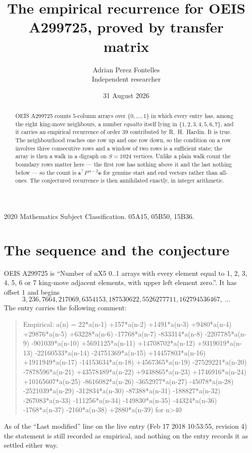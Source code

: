 \documentclass[11pt,a4paper]{article}
\title{The empirical recurrence for OEIS A299725, proved by transfer matrix}
\author{Adrian Perez Fontelles\\ \small Independent researcher}
\date{31 August 2026}
\theoremstyle{plain}
\theoremstyle{definition}
\begin{document}
\maketitle

\begin{abstract}
OEIS A299725 counts $5$-column arrays over $\{0,\dots,1\}$ in which every entry has,
among the eight king-move neighbours, a number $equal to$ itself lying in $\{1,2,3,4,5,6,7\}$, and it carries an empirical
recurrence of order $39$ contributed by R.~H.~Hardin. It is true. The neighbourhood
reaches one row up and one row down, so the condition on a row involves three consecutive
rows and a window of two rows is a sufficient state; the array is then a walk in a digraph
on $S=1024$ vertices. Unlike a plain walk count the boundary rows matter here --- the first
row has nothing above it and the last nothing below --- so the count is
$\mathbf{s}^{\!\top}P^{\,n-2}\mathbf{e}$ for genuine start and end vectors rather than
all-ones. The conjectured recurrence is then annihilated exactly, in integer arithmetic.
\end{abstract}

\noindent\small 2020 Mathematics Subject Classification. 05A15, 05B50, 15B36.\normalsize

\section{The sequence and the conjecture}

OEIS A299725 is ``Number of nX5 0..1 arrays with every element equal to 1, 2, 3, 4, 5, 6 or 7 king-move adjacent elements, with upper left element zero.''. It has offset
$1$ and begins
\[
3, 236, 7664, 217069, 6354153, 187530622, 5526277711, 162794536467,\ \dots
\]
The entry carries the following comment:
\begin{quote}\small
Empirical: a(n) = 22*a(n-1) +157*a(n-2) +1491*a(n-3) +9480*a(n-4) +29876*a(n-5) +63228*a(n-6) -17768*a(n-7) -833314*a(n-8) -2207785*a(n-9) -901039*a(n-10) +5691125*a(n-11) +14708702*a(n-12) +9319019*a(n-13) -22160533*a(n-14) -24751369*a(n-15) +14457803*a(n-16) +1911949*a(n-17) -14153634*a(n-18) +4567365*a(n-19) -27529221*a(n-20) -7878596*a(n-21) +43578489*a(n-22) +9438865*a(n-23) +1746916*a(n-24) +10165607*a(n-25) -8616082*a(n-26) -3652977*a(n-27) -45078*a(n-28) -2521039*a(n-29) -312834*a(n-30) -87388*a(n-31) -188827*a(n-32) -267083*a(n-33) -111256*a(n-34) -149830*a(n-35) -44324*a(n-36) -1768*a(n-37) -2160*a(n-38) +2880*a(n-39) for n>40
\end{quote}
As of the ``Last modified'' line on the live entry (Feb 17 2018 10:53:55, revision
4) the statement is still recorded as empirical, and nothing on the entry
records it as settled either way.
\end{document}
